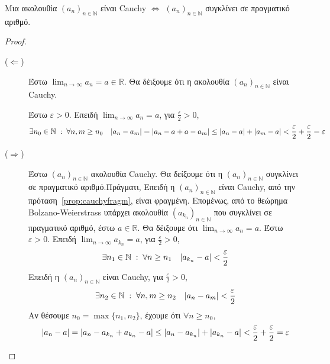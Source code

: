 \documentclass[a4paper,table]{report}
\begin{document}
\begin{mybox3}
  \begin{prop}
    Μια ακολουθία $ {(a_{n})}_{n \in \mathbb{N}} $ είναι Cauchy $ \Leftrightarrow $ 
    $ {(a_{n})}_{n \in \mathbb{N}} $ συγκλίνει σε πραγματικό αριθμό.
  \end{prop}
\end{mybox3}
\begin{proof}
\item {}
  \begin{description}
    \item [($ \Leftarrow $)] Έστω $ \lim_{n \to \infty} a_{n} = a \in \mathbb{R} $. 
      Θα δέιξουμε ότι η ακολουθία $ {(a_{n})}_{n \in \mathbb{N}} $ είναι Cauchy. 

      Έστω $ \varepsilon >0 $. Επειδή $ \lim_{n \to \infty} a_{n} = a $, για 
      $ \frac{\varepsilon}{2} > 0 $,
      \[ 
        \exists n_{0} \in \mathbb{N} \; : \; \forall n,m \geq n_{0} \quad 
        \abs{a_{n} - a_{m}} = 
        \abs{a_{n} - a + a - a_{m}} \leq \abs{a_{n}-a} + \abs{a_{m}-a} < 
        \frac{\varepsilon}{2} + \frac{\varepsilon}{2} = \varepsilon 
      \]
    \item [($ \Rightarrow $)] Έστω $ {(a_{n})}_{n \in \mathbb{N}} $ ακολουθία Cauchy. 
      Θα δείξουμε ότι η $ {(a_{n})}_{n \in \mathbb{N}} $ συγκλίνει σε πραγματικό
      αριθμό.Πράγματι, 
      Επειδή η $ {(a_{n})}_{n \in \mathbb{N}} $ είναι Cauchy, από την
      πρόταση~\ref{prop:cauchyfragm}, είναι φραγμένη. Επομένως, από το θεώρημα 
      Bolzano-Weierstrass υπάρχει ακολουθία $ (a_{k_{n}})_{n \in \mathbb{N}} $ 
      που συγκλίνει σε πραγματικό αριθμό, έστω $ a \in \mathbb{R} $. Θα δέιξουμε ότι 
      $ \lim_{n \to \infty} a_{n} = a $. Έστω $ \varepsilon >0 $. Επειδή $ \lim_{n \to
      \infty} a_{k_{n}} = a $, για $ \frac{\varepsilon}{2} > 0 $, 
      \[
        \exists n_{1} \in \mathbb{N} \; : \; \forall n \geq n_{1} \quad 
        \abs{a_{k_{n}}-a} < \frac{\varepsilon}{2}
      \] 
      Επειδή η $ {(a_{n})}_{n \in \mathbb{N}} $ είναι Cauchy, για $
      \frac{\varepsilon}{2} >0 $, 
      \[
        \exists n_{2} \in \mathbb{N} \; : \; \forall n,m \geq n_{2} \quad 
        \abs{a_{n}-a_{m}} < \frac{\varepsilon}{2}
      \] 
      Αν θέσουμε $ n_{0} = \max \{ n_{1}, n_{2} \} $, έχουμε ότι $ \forall n \geq n_{0}
      $, 
      \[
        \abs{a_{n}-a} = \abs{a_{n}-a_{k_{n}} + a_{k_{n}} - a} \leq \abs{a_{n}-
        a_{k_{n}}} + \abs{a_{k_{n}} - a} < \frac{\varepsilon}{2} + \frac{\varepsilon}{2}
        = \varepsilon 
      \] 
  \end{description}
\end{proof}
\end{document}

